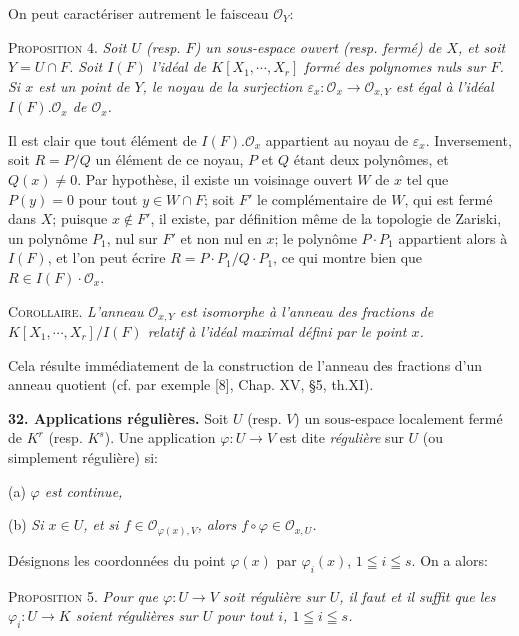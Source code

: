 
On peut caractériser autrement le faisceau $\mathcal{O}_Y$:

\textsc{Proposition 4.} \textit{Soit $U$ (resp. $F$) un sous-espace ouvert (resp. fermé) de $X$, et soit $Y = U \cap F$. Soit $I(F)$ l'idéal de $K[X_1, \cdots, X_r]$ formé des polynomes nuls sur $F$. Si $x$ est un point de $Y$, le noyau de la surjection $\varepsilon_x\colon \mathcal{O}_x \longrightarrow \mathcal{O}_{x,Y}$ est égal à l'idéal $I(F).\mathcal{O}_x$ de $\mathcal{O}_x$.}

Il est clair que tout élément de $I(F).\mathcal{O}_x$ appartient au noyau de $\varepsilon_x$. Inversement, soit $R = P/Q$ un élément de ce noyau, $P$ et $Q$ étant deux polynômes, et $Q(x) \neq 0$. Par hypothèse, il existe un voisinage ouvert $W$ de $x$ tel que $P(y) = 0$ pour tout $y \in W \cap F$; soit $F'$ le complémentaire de $W$, qui est fermé dans $X$; puisque $x \notin F'$, il existe, par définition même de la topologie de Zariski, un polynôme $P_1$, nul sur $F'$ et non nul en $x$; le polynôme $P \cdot P_1$ appartient alors à $I(F)$, et l'on peut écrire $R = P \cdot P_1/Q \cdot P_1$, ce qui montre bien que $R \in I(F) \cdot \mathcal{O}_x$.

\textsc{Corollaire.} \textit{L'anneau $\mathcal{O}_{x,Y}$ est isomorphe à l'anneau des fractions de $K[X_1, \cdots, X_r]/I(F)$ relatif à l'idéal maximal défini par le point $x$.}

Cela résulte immédiatement de la construction de l'anneau des fractions d'un anneau quotient (cf. par exemple [8], Chap. XV, §5, th.XI).

\textbf{32. Applications régulières.} Soit $U$ (resp. $V$) un sous-espace localement fermé de $K^r$ (resp. $K^s$). Une application $\varphi\colon U \to V$ est dite \textit{régulière} sur $U$ (ou simplement régulière) si:

(a) \textit{$\varphi$ est continue,}

(b) \textit{Si $x \in U$, et si $f \in \mathcal{O}_{\varphi(x),V}$, alors $f \circ \varphi \in \mathcal{O}_{x,U}$.}

Désignons les coordonnées du point $\varphi(x)$ par $\varphi_i(x)$, $1 \leqq i \leqq s$. On a alors:

\textsc{Proposition 5.} \textit{Pour que $\varphi\colon U \to V$ soit régulière sur $U$, il faut et il suffit que les $\varphi_i\colon U \to K$ soient régulières sur $U$ pour tout $i$, $1 \leqq i \leqq s$.}

